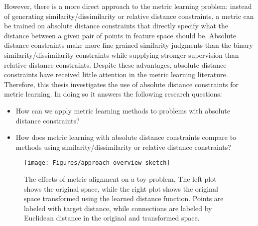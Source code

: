 However, there is a more direct approach to the metric learning problem: instead of generating similarity/dissimilarity or relative distance constraints, a metric can be trained on absolute distance constraints that directly specify what the distance between a given pair of points in feature space should be.  Absolute distance constraints make more fine-grained similarity judgments than the binary similarity/dissimilarity constraints while supplying stronger supervision than relative distance constraints. Despite these advantages, absolute distance constraints have received little attention in the metric learning literature. Therefore, this thesis investigates the use of absolute distance constraints for metric learning. In doing so it answers the following research questions:
\begin{itemize}
\item How can we apply metric learning methods to problems with absolute distance constraints?
\item How does metric learning with absolute distance constraints compare to methods using similarity/dissimilarity or relative distance constraints?
\end{itemize}

\begin{figure}[t]
\begin{center}
\texttt{[image: Figures/approach\_overview\_sketch]}
\caption{The effects of metric alignment on a toy problem. The left plot shows the original space, while the right plot shows the original space transformed using the learned distance function. Points are labeled with target distance, while connections are labeled by Euclidean distance in the original and transformed space.}
\label{fig:approach_overview}
\end{center}
\end{figure}

